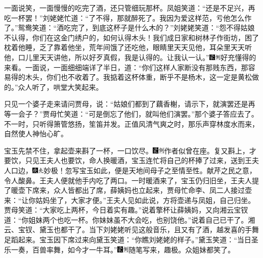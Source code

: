 一面说笑，一面慢慢的吃完了酒，还只管细玩那杯。凤姐笑道：“还是不足兴，再吃一杯罢！”刘姥姥忙道：“了不得，那就醉死了。我因为爱这样范，亏他怎么作了。”鸳鸯笑道：“酒吃完了，到底这杯子是什么木的？”刘姥姥笑道：“怨不得姑娘不认得，你们在这金门绣户的，如何认得木头！我们成日家和树林子作街坊，困了枕着他睡，乏了靠着他坐，荒年间饿了还吃他，眼睛里天天见他，耳朵里天天听他，口儿里天天讲他，所以好歹真假，我是认得的。让我认一认。”{\includegraphics[width=3mm]{../Images/00006}\includegraphics[width=3mm]{../Images/00011}\footnotesize \kaishu 好充懂得的来看。}一面说，一面细细端详了半日，道：“你们这样人家断没有那贱东西，那容易得的木头，你们也不收着了。我掂着这杯体重，断乎不是杨木，这一定是黄松做的。”众人听了，哄堂大笑起来。

只见一个婆子走来请问贾母，说：“姑娘们都到了藕香榭，请示下，就演罢还是再等一会子？”贾母忙笑道：“可是倒忘了他们，就叫他们演罢。”那个婆子答应去了。不一时，只听得箫管悠扬，笙笛并发。正值风清气爽之时，那乐声穿林度水而来，自然使人神怡心旷。

宝玉先禁不住，拿起壶来斟了一杯，一口饮尽。{\includegraphics[width=3mm]{../Images/00006}\includegraphics[width=3mm]{../Images/00011}\footnotesize \kaishu 作者似曾在座。}复又斟上，才要饮，只见王夫人也要饮，命人换暖酒，宝玉连忙将自己的杯捧了过来，送到王夫人口边，{\includegraphics[width=3mm]{../Images/00004}\includegraphics[width=3mm]{../Images/00012}\footnotesize \kaishu 妙极！忽写宝玉如此，便是天地间母子之至情至性。献芹之民之意，令人酸鼻。}王夫人便就他手内吃了两口。一时暖酒来了，宝玉仍归旧坐，王夫人提了暖壶下席来，众人皆都出了席，薛姨妈也立起来，贾母忙命李、凤二人接过壶来：“让你姑妈坐了，大家才便。”王夫人见如此说，方将壶递与凤姐，自己归坐。贾母笑道：“大家吃上两杯，今日着实有趣。”说着擎杯让薛姨妈，又向湘云宝钗道：“你姐妹两个也吃一杯。你妹妹虽不大会吃，也别饶他。”说着自己已干了。湘云、宝钗、黛玉也都干了。当下刘姥姥听见这般音乐，且又有了酒，越发喜的手舞足蹈起来。宝玉因下席过来向黛玉笑道：“你瞧刘姥姥的样子。”黛玉笑道：“当日圣乐一奏，百兽率舞，如今才一牛耳。”{\includegraphics[width=3mm]{../Images/00006}\includegraphics[width=3mm]{../Images/00011}\footnotesize \kaishu 随笔写来，趣极。}众姐妹都笑了。

